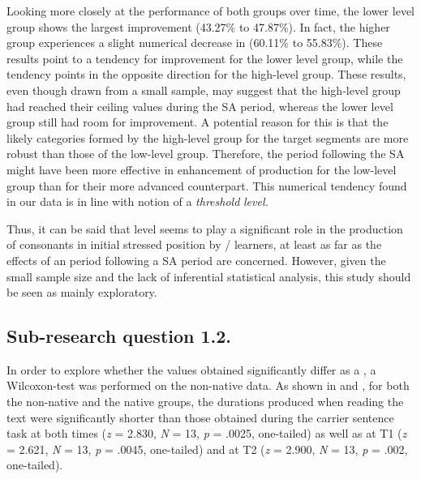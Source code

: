 \documentclass[output=paper]{langsci/langscibook}
\begin{document}
  Looking more closely at the performance of both groups over time, the lower level group shows the largest improvement (43.27\% to 47.87\%). In fact, the higher  group experiences a slight numerical decrease in  (60.11\% to 55.83\%). These results point to a tendency for improvement for the lower level group, while the tendency points in the opposite direction for the high-level group. These results, even though drawn from a small sample, may suggest that the high-level group had reached their ceiling  values during the SA period, whereas the lower level group still had room for improvement. A potential reason for this is that the likely  categories formed by the high-level group for the target segments are more robust than those of the low-level group. Therefore, the  period following the SA might have been more effective in enhancement of   production for the low-level group than for their more advanced counterpart. This numerical tendency found in our data is in line with  notion of a \textit{threshold} \textit{level.}



  Thus, it can be said that  level seems to play a significant role in the  production of   consonants in initial stressed position by /  learners, at least as far as the effects of an  period following a SA period are concerned. However, given the small sample size and the lack of inferential statistical analysis, this study should be seen as mainly exploratory.



\subsection{Sub-research question 1.2.}



In order to explore whether the  values obtained significantly differ as a , a Wilcoxon-test was performed on the non-native data. As shown in  and , for both the non-native and the native groups, the  durations produced when reading the text were significantly shorter than those obtained during the carrier sentence task at both times (\textit{z} = 2.830, \textit{N} = 13, \textit{p} = .0025, one-tailed) as well as at T1 (\textit{z} = 2.621, \textit{N} = 13, \textit{p} = .0045, one-tailed) and at T2 (\textit{z} = 2.900, \textit{N} = 13, \textit{p} = .002, one-tailed). 
\end{document}
